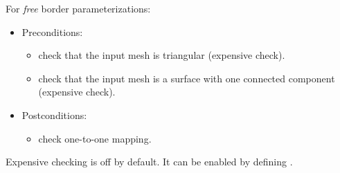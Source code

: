 For \emph{free} border parameterizations:
\begin{itemize}
\item Preconditions:
    \begin{itemize}
    \item check that the input mesh is triangular (expensive check).
    \item check that the input mesh is a surface with one connected component (expensive check).
    \end{itemize}
\item Postconditions:
    \begin{itemize}
    \item check one-to-one mapping.
    \end{itemize}
\end{itemize}

Expensive checking is off by default. It can be enabled by
defining .


\clearpage

